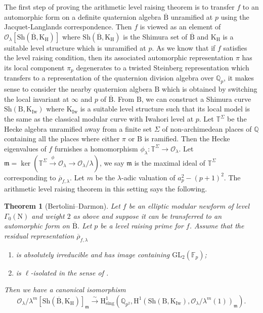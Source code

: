 \documentclass[10pt]{amsart}
\numberwithin{equation}{section}
\newtheorem{theorem}[equation]{Theorem}
\theoremstyle{definition}
\def\GL{\mathrm{GL}}
\def\calO{\mathcal{O}}
\def\fracm{\mathfrak{m}}
\def\FF{\mathbb{F}}
\def\QQ{\mathbb{Q}}
\def\TT{\mathbb{T}}
\def\rmB{\mathrm{B}}
\def\rmH{\mathrm{H}}
\def\rmK{\mathrm{K}}
\def\rmN{\mathrm{N}}
\def\Iw{\mathrm{Iw}}
\def\Sh{\mathrm{Sh}}
\begin{document}
The first step of proving the arithmetic level raising theorem is to transfer $f$ to an automorphic form on a definite quaternion algebra $\overline{\rmB}$ unramified at $p$ using the Jacquet-Langlands correspondence. Then $f$ is viewed as an element of $\calO_{\lambda}[\Sh(\overline{\rmB}, \rmK_{\rmH})]$
where $\Sh(\overline{\rmB}, \rmK_{\rmH})$ is the Shimura set of $\overline{\rmB}$ and $\rmK_{\rmH}$ is a suitable level structure which is unramified at $p$. As we know that if $f$ satisfies the level raising condition, then its associated automorphic representation $\pi$  has its local component $\pi_{p}$ degenerates to a twisted Steinberg representation which transfers to a representation of the quaternion division algebra over $\QQ_{p}$, it makes sense to consider the nearby quaternion algbera $\rmB$ which is obtained by switching the local invariant at $\infty$ and $p$ of $\overline{\rmB}$. From $\rmB$, we can construct a Shimura curve $\Sh(\rmB, \rmK_{\Iw})$ where $\rmK_{\Iw}$ is a suitable level structure such that 
its local model is the same as the classical modular curve with Iwahori level at $p$. Let $\TT^{\Sigma}$ be the Hecke algebra unramified away from a finite set $\Sigma$ of non-archimedean places of $\QQ$ containing all the places where either $\pi$ or $\rmB$ is ramified. Then the Hecke eigenvalues of $f$ furnishes a homomorphism $\phi_{\lambda}: \TT^{\Sigma}\rightarrow\calO_{\lambda}$. Let $\fracm=\ker(\TT^{\Sigma}\xrightarrow{\phi}\calO_{\lambda}\rightarrow\calO_{\lambda}/\lambda)$, we say $\fracm$ is the maximal ideal of $\TT^{\Sigma}$ corresponding to $\overline{\rho}_{f,\lambda}$. Let $m$ be the $\lambda$-adic valuation of $a^{2}_{p}-(p+1)^{2}$. The arithmetic level raising theorem in this setting says the following.
\begin{theorem}[Bertolini--Darmon]
Let $f$ be an elliptic modular newform of level $\Gamma_{0}(\rmN)$ and weight $2$ as above and suppose it can be transferred to an automorphic form on $\overline{\rmB}$. Let $p$ be a level raising prime for $f$. Assume that the residual representation $\overline{\rho}_{f,\lambda}$
\begin{enumerate}
\item  is absolutely irreducible and has image containing $\GL_{2}(\FF_{p})$;
\item  is $\ell$-isolated in the sense of \cite[Definition 1.2]{BD-Main}.
\end{enumerate} 
Then we have a canonical isomorphism
\begin{equation*}
\calO_{\lambda}/\lambda^{m}[\Sh(\overline{\rmB}, \rmK_{\rmH})]_{\fracm}\xrightarrow{\sim} \rmH^{1}_{\mathrm{sing}}(\QQ_{p^{2}}, \rmH^{1}(\Sh(\rmB, \rmK_{\Iw}), \calO_{\lambda}/\lambda^{m}(1))_{\fracm}).
\end{equation*}
\end{theorem}
\end{document}
